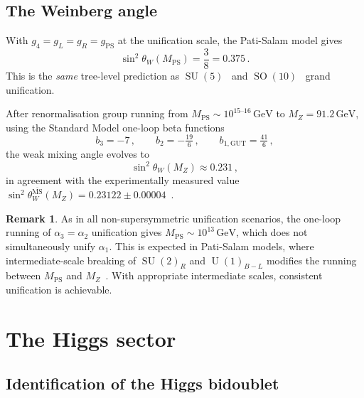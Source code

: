 \documentclass[12pt,a4paper]{article}
\theoremstyle{definition}
\newtheorem{remark}[theorem]{Remark}
\newcommand{\SO}{\operatorname{SO}}
\newcommand{\SU}{\operatorname{SU}}
\newcommand{\U}{\operatorname{U}}
\begin{document}
\subsection{The Weinberg angle}

With $g_4 = g_L = g_R = g_{\mathrm{PS}}$ at the unification scale, the Pati-Salam model gives
\begin{equation}
\sin^2\theta_W(M_{\mathrm{PS}}) = \frac{3}{8} = 0.375\,.
\end{equation}
This is the \emph{same} tree-level prediction as $\SU(5)$~\cite{GeorgiGlashow1974} and $\SO(10)$~\cite{FritschMinkowski1975} grand unification.

After renormalisation group running from $M_{\mathrm{PS}} \sim 10^{15\text{--}16}\,\text{GeV}$ to $M_Z = 91.2\,\text{GeV}$, using the Standard Model one-loop beta functions
\begin{equation}
b_3 = -7\,, \qquad b_2 = -\tfrac{19}{6}\,, \qquad b_{1,\text{GUT}} = \tfrac{41}{6}\,,
\end{equation}
the weak mixing angle evolves to
\begin{equation}
\sin^2\theta_W(M_Z) \approx 0.231\,,
\end{equation}
in agreement with the experimentally measured value $\sin^2\theta_W^{\overline{\mathrm{MS}}}(M_Z) = 0.23122 \pm 0.00004$~\cite{PDG2024}.

\begin{remark}
As in all non-supersymmetric unification scenarios, the one-loop running of $\alpha_3 = \alpha_2$ unification gives $M_{\mathrm{PS}} \sim 10^{13}\,\text{GeV}$, which does not simultaneously unify $\alpha_1$.
This is expected in Pati-Salam models, where intermediate-scale breaking of $\SU(2)_R$ and $\U(1)_{B-L}$ modifies the running between $M_{\mathrm{PS}}$ and $M_Z$~\cite{MohapatraPati1975}.
With appropriate intermediate scales, consistent unification is achievable.
\end{remark}


\section{The Higgs sector}
\label{sec:higgs}

\subsection{Identification of the Higgs bidoublet}
\end{document}
